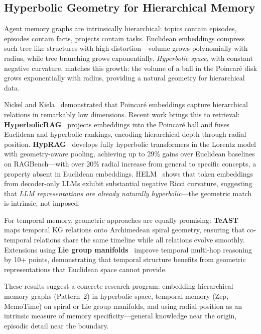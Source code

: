 \documentclass[hf]{ceurart}
\begin{document}
\subsection{Hyperbolic Geometry for Hierarchical Memory}

Agent memory graphs are intrinsically hierarchical: topics contain
episodes, episodes contain facts, projects contain tasks. Euclidean
embeddings compress such tree-like structures with high
distortion---volume grows polynomially with radius, while tree
branching grows exponentially.
\emph{Hyperbolic space}, with constant negative curvature, matches this
growth: the volume of a ball in the Poincar\'{e} disk grows
exponentially with radius, providing a natural geometry for hierarchical
data.

Nickel and Kiela~\cite{nickel2017poincare} demonstrated that Poincar\'{e}
embeddings capture hierarchical relations in remarkably low dimensions.
Recent work brings this to retrieval:
\textbf{HyperbolicRAG}~\cite{hyperbolicrag2025} projects embeddings
into the Poincar\'{e} ball and fuses Euclidean and hyperbolic rankings,
encoding hierarchical depth through radial position.
\textbf{HypRAG}~\cite{hyprag2026} develops fully hyperbolic
transformers in the Lorentz model with geometry-aware pooling, achieving
up to 29\% gains over Euclidean baselines on RAGBench---with over 20\%
radial increase from general to specific concepts, a property absent
in Euclidean embeddings.
HELM~\cite{helm2025} shows that token embeddings from decoder-only LLMs
exhibit substantial negative Ricci curvature, suggesting that
\emph{LLM representations are already naturally hyperbolic}---the
geometric match is intrinsic, not imposed.

For temporal memory, geometric approaches are equally promising:
\textbf{TeAST}~\cite{teast2023} maps temporal KG relations onto
Archimedean spiral geometry, ensuring that co-temporal relations share
the same timeline while all relations evolve smoothly. Extensions using
\textbf{Lie group manifolds}~\cite{liegroup2024} improve temporal
multi-hop reasoning by 10+ points, demonstrating that temporal
structure benefits from geometric representations that Euclidean space
cannot provide.

These results suggest a concrete research program: embedding
hierarchical memory graphs (Pattern~2) in hyperbolic space, temporal
memory (Zep, MemoTime) on spiral or Lie group manifolds, and using
radial position as an intrinsic measure of memory specificity---general
knowledge near the origin, episodic detail near the boundary.
\end{document}
